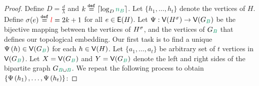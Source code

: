 \documentclass[11pt]{article}
\begin{document}
\begin{proof}
Define $D = \frac{d}{\lambda}$ and $k \Def \lceil\log_D\na\rceil$.
Let $\{ h_1, \dots, h_t\}$ denote the vertices of $H$.
Define $\sigma(e) \text{}\overset{\mathtt{def}}{=} \textcolor{red}{l} = 2k+1$ for all $e \in \mathsf{E}(H)$.
Let $\EmbeddingFunc: \Vertices{\Subdivision{H}{\sigma}} \rightarrow \Vertices{G_{\GreenB}}$ be the bijective mapping between the vertices of ${H}^{\sigma}$, and the vertices of $G_{\GreenB}$ that defines our topological embedding.
Our first task is to find a unique $\Embedding{h} \in \Vertices{G_{\GreenB}}$ for each $h \in \mathsf{V}(H)$.
Let $\{a_1, \dots, a_{t}\}$ be arbitrary set of $t$ vertices in $\Vertices{G_{\GreenB}}$.
Let $X=\Vertices{G_{\GreenB}}$ and $Y=\Vertices{G_{\GreenB}}$ denote the left and right sides of the bipartite graph $\BipartiteG$.
We repeat the following process to obtain $\{ \Psi\left(h_1\right), \dots, \Psi\left(h_t\right)\}$: 


\end{proof}
\end{document}
